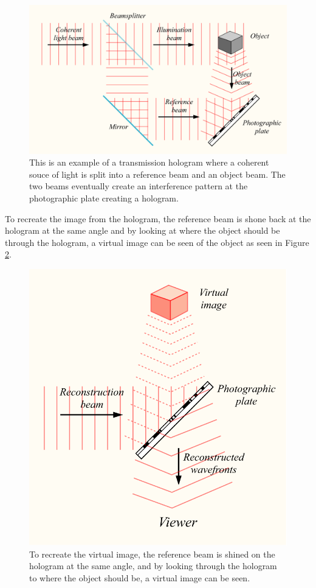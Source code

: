 \documentclass[ notitlepage, numerical, 11pt]{revtex4-1} %
\begin{document}
\begin{figure}[H]
\centerline{\includegraphics[scale=.45]{create.png}}
\caption{This is an example of a transmission hologram where a coherent souce of light is split into a reference beam and an object beam. The two beams eventually create an interference pattern at the photographic plate creating a hologram. }
\label{create}
\end{figure} 

To recreate the image from the hologram, the reference beam is shone back at the hologram at the same angle and by looking at where the object should be through the hologram, a virtual image can be seen of the object as seen in Figure \ref{reconstruct}.

\begin{figure}[H]
\centerline{\includegraphics[scale=.45]{reconstruct.png}}
\caption{To recreate the virtual image, the reference beam is shined on the hologram at the same angle, and by looking through the hologram to where the object should be, a virtual image can be seen.}
\label{reconstruct}
\end{figure} 
\end{document}
